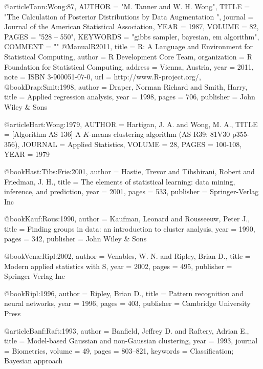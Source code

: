 @article{Tann:Wong:87,
        AUTHOR = "M. Tanner and W. H. Wong",
        TITLE = "The Calculation of Posterior Distributions by Data Augmentation
",
    journal = {Journal of the American Statistical Association},
        YEAR = 1987,
        VOLUME = 82,
        PAGES = "528 -- 550",
        KEYWORDS = "gibbs sampler, bayesian, em algorithm",
        COMMENT = ""}
@Manual{R2011,
    title = {R: A Language and Environment for Statistical Computing},
    author = {{R Development Core Team}},
    organization = {R Foundation for Statistical Computing},
    address = {Vienna, Austria},
    year = {2011},
    note = {{ISBN} 3-900051-07-0},
    url = {http://www.R-project.org/},
  }
@book{Drap:Smit:1998,
    author = {Draper, Norman Richard and Smith, Harry},
    title = {Applied regression analysis},
    year = {1998},
    pages = {706},
    publisher = {John Wiley \& Sons}
}

@article{Hart:Wong:1979,
AUTHOR   = {Hartigan, J. A. and Wong, M. A.},
TITLE    = {[\uppercase{A}lgorithm \uppercase{AS} 136] \uppercase{A} $K$-means
clustering algorithm (\uppercase{AS} \uppercase{R}39: 81V30 p355-356)},
JOURNAL  = {Applied Statistics},
VOLUME   = 28,
PAGES    = {100-108},
YEAR     = 1979
}

@book{Hast:Tibs:Frie:2001,
    author = {Hastie, Trevor and Tibshirani, Robert and Friedman, J.  H.},
    title = {The elements of statistical learning: data mining,
inference, and prediction},
    year = {2001},
    pages = {533},
    publisher = {Springer-Verlag Inc}
}

@book{Kauf:Rous:1990,
    author = {Kaufman, Leonard and Rousseeuw, Peter J.},
    title = {Finding groups in data: an introduction to cluster analysis},
    year = {1990},
    pages = {342},
    publisher = {John Wiley & Sons}
}

@book{Vena:Ripl:2002,
    author = {Venables, W. N. and Ripley, Brian D.},
    title = {Modern applied statistics with {S}},
    year = {2002},
    pages = {495},
    publisher = {Springer-Verlag Inc}
}

@book{Ripl:1996,
    author = {Ripley, Brian D.},
    title = {Pattern recognition and neural networks},
    year = {1996},
    pages = {403},
    publisher = {Cambridge University Press}
}

@article{Banf:Raft:1993,
    author = {Banfield, Jeffrey D. and Raftery, Adrian E.},
    title = {Model-based {G}aussian and non-{G}aussian clustering},
    year = {1993},
    journal = {Biometrics},
    volume = {49},
    pages = {803--821},
    keywords = {Classification; Bayesian approach}
}

